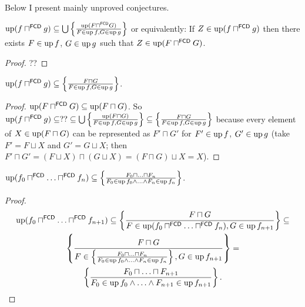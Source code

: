 

\noindent\makebox[\linewidth]{\rule{\paperwidth}{0.4pt}}

Below I present mainly unproved conjectures.

\begin{lem}
$\operatorname{up} (f \sqcap^{\mathsf{FCD}} g) \subseteq \bigcup \left\{ \frac{
\operatorname{up} (F \sqcap^{\mathsf{FCD}} G) }{ F \in \operatorname{up} f, G \in \operatorname{up} g }\right\}$
or equivalently: If $Z\in\operatorname{up} (f \sqcap^{\mathsf{FCD}} g)$ then there exists
$F \in \operatorname{up} f$, $G \in \operatorname{up} g$ such that $Z\in\operatorname{up} (F \sqcap^{\mathsf{FCD}} G)$.
\end{lem}

\begin{proof}
??
\end{proof}

\begin{prop}
$\operatorname{up} (f \sqcap^{\mathsf{FCD}} g) \subseteq \left\{ \frac{ F \sqcap G }{ F \in \operatorname{up} f, G \in \operatorname{up} g }\right\}$.
\end{prop}

\begin{proof}
$\operatorname{up} (F \sqcap^{\mathsf{FCD}} G) \subseteq \operatorname{up} (F
\sqcap G)$. So $\operatorname{up} (f \sqcap^{\mathsf{FCD}} g) \subseteq ?? \subseteq \bigcup
\left\{ \frac{ \operatorname{up} (F \sqcap G) }{ F \in \operatorname{up} f,
G \in \operatorname{up} g }\right\} \subseteq \left\{ \frac{ F \sqcap G }{ F \in \operatorname{up} f, G \in \operatorname{up} g }\right\}$ because every
element of $X \in \operatorname{up} (F \sqcap G)$ can be represented as $F' \sqcap G'$
for $F' \in \operatorname{up} f$, $G' \in \operatorname{up} g$ (take $F' = F \sqcup X$ and $G'
= G \sqcup X$; then $F' \sqcap G' = (F \sqcup X) \sqcap (G \sqcup X) = (F
\sqcap G) \sqcup X = X$).
\end{proof}

\begin{cor}
$\operatorname{up} (f_0 \sqcap^{\mathsf{FCD}} \ldots
\sqcap^{\mathsf{FCD}} f_n) \subseteq \left\{ \frac{ F_0 \sqcap \ldots \sqcap
F_n }{ F_0 \in \operatorname{up} f_0 \wedge \ldots \wedge F_n \in \operatorname{up} f_n }\right\}$.
\end{cor}

\begin{proof}
~
\begin{multline*}
\operatorname{up} (f_0 \sqcap^{\mathsf{FCD}} \ldots
\sqcap^{\mathsf{FCD}} f_{n + 1}) \subseteq \left\{ \frac{ F \sqcap G
}{ F \in \operatorname{up} (f_0 \sqcap^{\mathsf{FCD}}
\ldots \sqcap^{\mathsf{FCD}} f_n), G \in \operatorname{up} f_{n + 1} }\right\} \subseteq \\
\left\{ \frac{ F \sqcap G }{ F \in \left\{ \frac{ F_0
\sqcap \ldots \sqcap F_n }{ F_0 \in \operatorname{up} f_0
\wedge \ldots \wedge F_n \in \operatorname{up} f_n }\right\}, G \in \operatorname{up} f_{n + 1} }\right\} = \\
\left\{ \frac{ F_0 \sqcap \ldots \sqcap F_{n + 1} }{
F_0 \in \operatorname{up} f_0 \wedge \ldots \wedge F_{n + 1} \in
\operatorname{up} f_{n + 1} }\right\}.
\end{multline*}
\end{proof}

